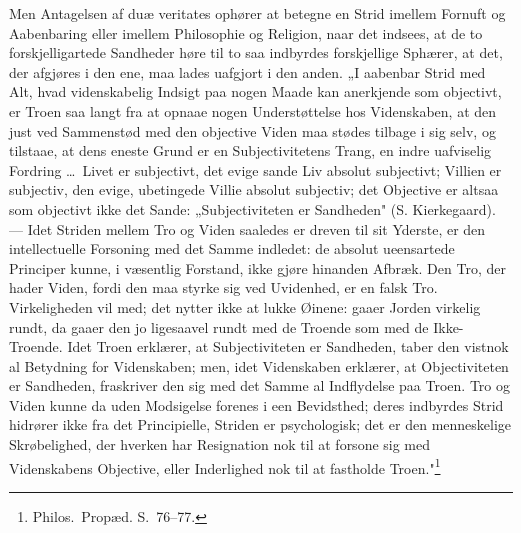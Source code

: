 \documentclass[12pt]{book}
\begin{document}
Men Antagelsen af duæ veritates ophører at betegne en Strid imellem Fornuft og
Aabenbaring eller imellem Philosophie og Religion, naar det indsees, at de to
forskjelligartede Sandheder høre til to saa indbyrdes forskjellige Sphærer, at det,
der afgjøres i den ene, maa lades uafgjort i den anden. „I aabenbar Strid med Alt,
hvad videnskabelig Indsigt paa nogen Maade kan anerkjende som objectivt, er Troen
saa langt fra at opnaae nogen Understøttelse hos Videnskaben, at den just ved
Sammenstød med den objective Viden maa stødes tilbage i sig selv, og tilstaae, at
dens eneste Grund er en Subjectivitetens Trang, en indre uafviselig Fordring \dots\
Livet er subjectivt, det evige sande Liv absolut subjectivt; Villien er subjectiv,
den evige, ubetingede Villie absolut subjectiv; det Objective er altsaa som
objectivt ikke det Sande: „Subjectiviteten er Sandheden" (S. Kierkegaard). --- Idet
Striden mellem Tro og Viden saaledes er dreven til sit Yderste, er den
intellectuelle Forsoning med det Samme indledet: de absolut ueensartede Principer
kunne, i væsentlig Forstand, ikke gjøre hinanden Afbræk. Den Tro, der hader Viden,
fordi den maa styrke sig ved Uvidenhed, er en falsk Tro. Virkeligheden vil med; det
nytter ikke at lukke Øinene: gaaer Jorden virkelig rundt, da gaaer den jo ligesaavel
rundt med de Troende som med de Ikke-Troende. Idet Troen erklærer, at Subjectiviteten
er Sandheden, taber den vistnok al Betydning for Videnskaben; men, idet Videnskaben
erklærer, at Objectiviteten er Sandheden, fraskriver den sig med det Samme al
Indflydelse paa Troen. Tro og Viden kunne da uden Modsigelse forenes i een
Bevidsthed; deres indbyrdes Strid hidrører ikke fra det Principielle, Striden er
psychologisk; det er den menneskelige Skrøbelighed, der hverken har Resignation nok
til
at forsone sig med Videnskabens Objective, eller Inderlighed nok til at fastholde
Troen."\footnote{Philos.\ Propæd. S.~76--77.}
\end{document}
